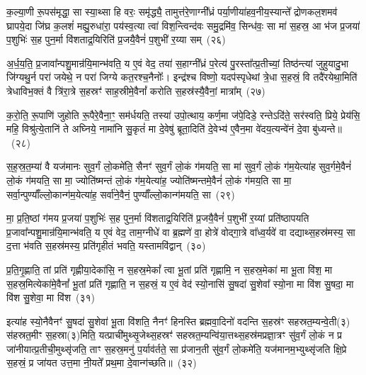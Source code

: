क॒ल्या॒णी रू॒पस॑मृद्धा॒ सा स्या॒थ्सा हि वरः॒ समृ॑द्ध्यै॒ तामुत्त॑रे॒णाग्नी᳚ध्रं पर्या॒णीया॑हव॒नीय॒स्यान्ते᳚ द्रोणकल॒शमव॑ घ्रापये॒दा जि॑घ्र क॒लशं॑ मह्यु॒रुधा॑रा॒ पय॑स्व॒त्या त्वा॑ विश॒न्त्विन्द॑वः समु॒द्रमि॑व॒ सिन्ध॑वः॒ सा मा॑ स॒हस्र॒ आ भ॑ज प्र॒जया॑ प॒शुभिः॑ स॒ह पुन॒र्मा वि॑शताद्र॒यिरिति॑ प्र॒जयै॒वैनं॑ प॒शुभी॑ र॒य्या सम्~(२६)

अ॒र्ध॒य॒ति॒ प्र॒जावा᳚न्पशु॒मान्र॑यि॒मान्भ॑वति॒ य ए॒वं वेद॒ तया॑ स॒हाग्नी᳚ध्रं प॒रेत्य॑ पु॒रस्ता᳚त्प्र॒तीच्यां॒ तिष्ठ॑न्त्यां जुहुयादु॒भा जि॑ग्यथु॒र्न परा॑ जयेथे॒ न परा॑ जिग्ये कत॒रश्च॒नैनोः᳚। इन्द्र॑श्च विष्णो॒ यदप॑स्पृधेथां त्रे॒धा स॒हस्रं॒ वि तदै॑रयेथा॒मिति॑ त्रेधाविभ॒क्तं वै त्रि॑रा॒त्रे स॒हस्रꣳ॑ साह॒स्रीमे॒वैनां᳚ करोति स॒हस्र॑स्यै॒वैनां॒ मात्रा᳚म्~(२७)

क॒रो॒ति॒ रू॒पाणि॑ जुहोति रू॒पैरे॒वैना॒ꣳ॒ सम॑र्धयति॒ तस्या॑ उपो॒त्थाय॒ कर्ण॒मा ज॑पे॒दिडे॒ रन्ते\-ऽदि॑ते॒ सर॑स्वति॒ प्रिये॒ प्रेय॑सि॒ महि॒ विश्रु॑त्ये॒तानि॑ ते अघ्निये॒ नामा॑नि सु॒कृतं॑ मा दे॒वेषु॑ ब्रूता॒दिति॑ दे॒वेभ्य॑ ए॒वैन॒मा वे॑दय॒त्यन्वे॑नं दे॒वा बु॑ध्यन्ते॥~(२८)

{\anuvakamend[{ए॒तदे॒तस्यां᳚ वी॒र्य॑मस्य त्रि॒भिश्च॑ द॒त्ता स॑हस्रत॒मी तस्मा॑दे॒व वरः॒ सं मात्रा॒मेका॒न्नच॑त्वारि॒ꣳ॒शच्च॑}]}%

स॒ह॒स्र॒त॒म्या॑ वै यज॑मानः सुव॒र्गं लो॒कमे॑ति॒ सैनꣳ॑ सुव॒र्गं लो॒कं ग॑मयति॒ सा मा॑ सुव॒र्गं लो॒कं ग॑म॒येत्या॑ह सुव॒र्गमे॒वैनं॑ लो॒कं ग॑मयति॒ सा मा॒ ज्योति॑ष्मन्तं लो॒कं ग॑म॒येत्या॑ह॒ ज्योति॑ष्मन्तमे॒वैनं॑ लो॒कं ग॑मय॒ति सा मा॒ सर्वा॒न्पुण्याँ᳚ल्लो॒कान्ग॑म॒येत्या॑ह॒ सर्वा॑ने॒वैनं॒ पुण्याँ᳚ल्लो॒कान्ग॑मयति॒ सा~(२९)

मा॒ प्र॒ति॒ष्ठां ग॑मय प्र॒जया॑ प॒शुभिः॑ स॒ह पुन॒र्मा वि॑शताद्र॒यिरिति॑ प्र॒जयै॒वैनं॑ प॒शुभी॑ र॒य्यां प्रति॑\-ष्ठापयति प्र॒जावा᳚न्पशु॒मान्र॑यि॒मान्भ॑वति॒ य ए॒वं वेद॒ ताम॒ग्नीधे॑ वा ब्र॒ह्मणे॑ वा॒ होत्रे॑ वोद्गा॒त्रे वा᳚ध्व॒र्यवे॑ वा दद्याथ्स॒हस्र॑मस्य॒ सा द॒त्ता भ॑वति स॒हस्र॑मस्य॒ प्रति॑गृहीतं भवति॒ यस्तामवि॑द्वान्~(३०)

प्र॒ति॒गृ॒ह्णाति॒ तां प्रति॑ गृह्णीया॒देका॑सि॒ न स॒हस्र॒मेकां᳚ त्वा भू॒तां प्रति॑ गृह्णामि॒ न स॒हस्र॒मेका॑ मा भू॒ता वि॑श॒ मा स॒हस्र॒मित्येका॑मे॒वैनां᳚ भू॒तां प्रति॑ गृह्णाति॒ न स॒हस्रं॒ य ए॒वं वेद॑ स्यो॒नासि॑ सु॒षदा॑ सु॒शेवा᳚ स्यो॒ना मा वि॑श सु॒षदा॒ मा वि॑श सु॒शेवा॒ मा वि॑श~(३१)

इत्या॑ह स्यो॒नैवैनꣳ॑ सु॒षदा॑ सु॒शेवा॑ भू॒ता वि॑शति॒ नैनꣳ॑ हिनस्ति ब्रह्मवा॒दिनो॑ वदन्ति स॒हस्र॑ꣳ सहस्रत॒म्यन्वे॒ती(३) स॑हस्रत॒मीꣳ स॒हस्रा(३)मिति॒ यत्प्राची॑मुथ्सृ॒जेथ्स॒हस्रꣳ॑ सहस्रत॒म्यन्वि॑या॒त्तथ्स॒हस्र॑मप्रज्ञा॒त्रꣳ सु॑व॒र्गं लो॒कं न प्र जा॑नीयात्प्र॒तीची॒मुथ्सृ॑जति॒ ताꣳ स॒हस्र॒मनु॑ प॒र्याव॑र्तते॒ सा प्र॑जान॒ती सु॑व॒र्गं लो॒कमे॑ति॒ यज॑मानम॒भ्युथ्सृ॑जति क्षि॒प्रे स॒हस्रं॒ प्र जा॑यत उत्त॒मा नी॒यते᳚ प्रथ॒मा दे॒वान्ग॑च्छति॥~(३२)

